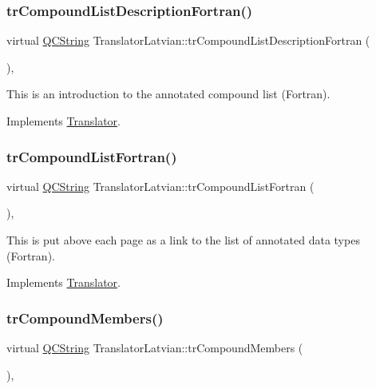 \subsubsection{\texorpdfstring{trCompoundListDescriptionFortran()}{trCompoundListDescriptionFortran()}}
{\footnotesize\ttfamily virtual \mbox{\hyperlink{class_q_c_string}{Q\+C\+String}} Translator\+Latvian\+::tr\+Compound\+List\+Description\+Fortran (\begin{DoxyParamCaption}{ }\end{DoxyParamCaption})\hspace{0.3cm}{\ttfamily [inline]}, {\ttfamily [virtual]}}

This is an introduction to the annotated compound list (Fortran). 

Implements \mbox{\hyperlink{class_translator}{Translator}}.

\mbox{\label{class_translator_latvian_a83702eedf5252a5db09e4ab05e7c4641}} 
\subsubsection{\texorpdfstring{trCompoundListFortran()}{trCompoundListFortran()}}
{\footnotesize\ttfamily virtual \mbox{\hyperlink{class_q_c_string}{Q\+C\+String}} Translator\+Latvian\+::tr\+Compound\+List\+Fortran (\begin{DoxyParamCaption}{ }\end{DoxyParamCaption})\hspace{0.3cm}{\ttfamily [inline]}, {\ttfamily [virtual]}}

This is put above each page as a link to the list of annotated data types (Fortran). 

Implements \mbox{\hyperlink{class_translator}{Translator}}.

\mbox{\label{class_translator_latvian_a5e6acb7e96b6695cf7ac4bfb998920cb}} 
\subsubsection{\texorpdfstring{trCompoundMembers()}{trCompoundMembers()}}
{\footnotesize\ttfamily virtual \mbox{\hyperlink{class_q_c_string}{Q\+C\+String}} Translator\+Latvian\+::tr\+Compound\+Members (\begin{DoxyParamCaption}{ }\end{DoxyParamCaption})\hspace{0.3cm}{\ttfamily [inline]}, {\ttfamily [virtual]}}

